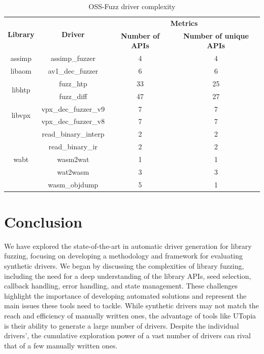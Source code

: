 \documentclass[a4paper,11pt,oneside]{report}
\begin{document}
\begin{table}[h]
  \centering
  \caption{OSS-Fuzz driver complexity}
  \label{tab:drivers_apis_ossfuzz}
  \begin{tabular}{|c|c|c|c|}
    \hline
    \multirow{2}{*}{\textbf{Library}} & \multirow{2}{*}{\textbf{Driver}} & \multicolumn{2}{c|}{\textbf{Metrics}} \\
    \cline{3-4}
     &  & \textbf{Number of APIs} & \textbf{Number of unique APIs}  \\
    \hline
    \multirow{1}{*}{assimp} & assimp\_fuzzer & 4 & 4  \\
    \hline
    \multirow{1}{*}{libaom} & av1\_dec\_fuzzer & 6 & 6  \\
    \hline
    \multirow{2}{*}{libhtp} & fuzz\_htp & 33 & 25 \\
     & fuzz\_diff & 47 & 27 \\
    \hline
    \multirow{2}{*}{libvpx} & vpx\_dec\_fuzzer\_v9 & 7 & 7  \\
     & vpx\_dec\_fuzzer\_v8 & 7 & 7 \\
    \hline
    \multirow{5}{*}{wabt} & read\_binary\_interp & 2 & 2  \\
     & read\_binary\_ir & 2 & 2 \\
     & wasm2wat & 1 & 1  \\
     & wat2wasm & 3 & 3 \\
     & wasm\_objdump & 5 & 1 \\
    \hline
  \end{tabular}
\end{table}









\chapter{Conclusion}

We have explored the state-of-the-art in automatic driver generation
for library fuzzing, focusing on developing a methodology and framework
for evaluating synthetic drivers. We began by discussing the complexities 
of library fuzzing, including the need for a deep understanding of the 
library APIs, seed selection, callback handling, error handling, and 
state management. These challenges highlight the importance of 
developing automated solutions and represent the main issues these tools 
need to tackle. While synthetic drivers may not match the reach and 
efficiency of manually written ones, the advantage of tools like UTopia 
is their ability to generate a large number of drivers. Despite the 
individual drivers', the cumulative exploration power of a vast number of 
drivers can rival that of a few manually written ones.
\end{document}
